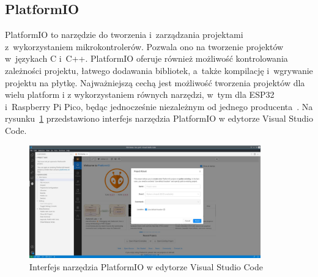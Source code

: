 \subsection{PlatformIO}
PlatformIO to narzędzie do tworzenia i~zarządzania projektami z~wykorzystaniem mikrokontrolerów.
Pozwala ono na tworzenie projektów w~językach C i~C++.
PlatformIO oferuje również możliwość kontrolowania zależności projektu, łatwego dodawania bibliotek, a~także kompilację i~wgrywanie projektu na płytkę.
Najważniejszą cechą jest możliwość tworzenia projektów dla wielu platform i z wykorzystaniem równych narzędzi, w~tym dla ESP32 i~Raspberry Pi Pico, będąc jednocześnie niezależnym od jednego producenta~\cite{tool:pio}. Na rysunku~\ref{fig:pio} przedstawiono interfejs narzędzia PlatformIO w edytorze Visual Studio Code.

\begin{figure}[b!]
    \begin{center}
        \includegraphics[angle=90, width=10cm]{pic/pio.jpg}
    \end{center}
    \caption{Interfejs narzędzia PlatformIO w edytorze Visual Studio Code}\label{fig:pio}
\end{figure}
